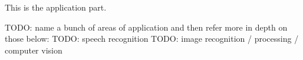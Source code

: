 This is the application part.

TODO: name a bunch of areas of application and then refer more in depth on those below:
TODO: speech recognition
TODO: image recognition / processing / computer vision \cite{li2009markov}